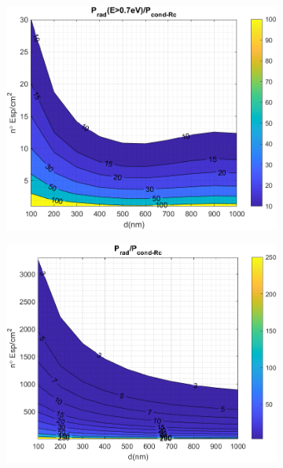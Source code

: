 \begin{figure}[H]
\begin{subfigure}[b]{0.49\textwidth}
		\caption{ }
		\label{fig:rel_SiSiO2Si_full}
	\end{subfigure}
	\hfill
	\begin{subfigure}[b]{0.49\textwidth}
		\centering
		\includegraphics[width=1.00\textwidth]{figuras/Resultados/RelacionCondRad/SiSi_Rc.png}
		\caption{ }
		\label{fig:rel_SiSiO2Si_Rc}
	\end{subfigure}
	\hfill
	\begin{subfigure}[b]{0.49\textwidth}
		\centering
		\includegraphics[width=1.00\textwidth]{figuras/Resultados/RelacionCondRad/SiSi_Rc_full.png}
		\caption{ }
		\label{fig:rel_SiSiO2Si_Rc_full}
	\end{subfigure}
	\caption{ }
	\label{fig:relation_SiSiO2Si}
\end{figure}

